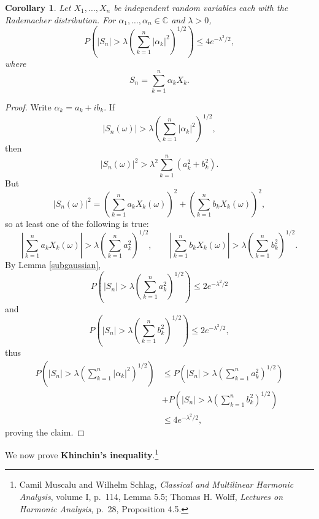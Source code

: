 \documentclass{article}
\newtheorem{corollary}[theorem]{Corollary}
\theoremstyle{definition}
\begin{document}
\begin{corollary}
Let $X_1,\ldots,X_n$ be independent random variables each with the Rademacher distribution. For
$\alpha_1,\ldots,\alpha_n \in \mathbb{C}$ and $\lambda>0$,
\[
P\left(\left|S_n \right| > \lambda \left(\sum_{k=1}^n |\alpha_k|^2 \right)^{1/2}\right) \leq 4e^{-\lambda^2/2},
\]
where
\[
S_n = \sum_{k=1}^n \alpha_k X_k.
\]
\label{complex}
\end{corollary}
\begin{proof}
Write $\alpha_k = a_k+ib_k$. If
\[
\left|S_n(\omega) \right| > \lambda \left(\sum_{k=1}^n |\alpha_k|^2\right)^{1/2},
\]
then 
\[
|S_n(\omega)|^2 > \lambda^2 \sum_{k=1}^n (a_k^2+b_k^2).
\]
But
\[
|S_n(\omega)|^2 
=\left( \sum_{k=1}^n a_kX_k(\omega) \right)^2 + \left(\sum_{k=1}^n b_k X_k(\omega) \right)^2,
\]
so at least one of the following is true:
\[
 \left|\sum_{k=1}^n a_kX_k(\omega)\right|  > \lambda \left(\sum_{k=1}^n a_k^2\right)^{1/2},
 \qquad  \left|\sum_{k=1}^n b_kX_k(\omega)\right|  > \lambda \left(\sum_{k=1}^n b_k^2\right)^{1/2}.
\]
By Lemma \ref{subgaussian},
\[
P\left(\left|S_n \right| > \lambda \left(\sum_{k=1}^n a_k^2 \right)^{1/2}\right) \leq 2e^{-\lambda^2/2}
\]
and
\[
P\left(\left|S_n \right| > \lambda \left(\sum_{k=1}^n b_k^2 \right)^{1/2}\right) \leq 2e^{-\lambda^2/2},
\]
thus
\begin{align*}
P\left(\left|S_n \right| > \lambda \left(\sum_{k=1}^n |\alpha_k|^2 \right)^{1/2}\right)&\leq 
P\left(\left|S_n \right| > \lambda \left(\sum_{k=1}^n a_k^2 \right)^{1/2}\right)\\
&+P\left(\left|S_n \right| > \lambda \left(\sum_{k=1}^n b_k^2 \right)^{1/2}\right)\\
&\leq 4e^{-\lambda^2/2},
\end{align*}
proving the claim.
\end{proof}


We now prove \textbf{Khinchin's inequality}.\footnote{Camil Muscalu and Wilhelm Schlag, {\em Classical and Multilinear Harmonic Analysis}, volume I,
p.~114, Lemma 5.5;
Thomas H. Wolff, {\em Lectures on Harmonic Analysis}, p.~28, Proposition 4.5.}
\end{document}
